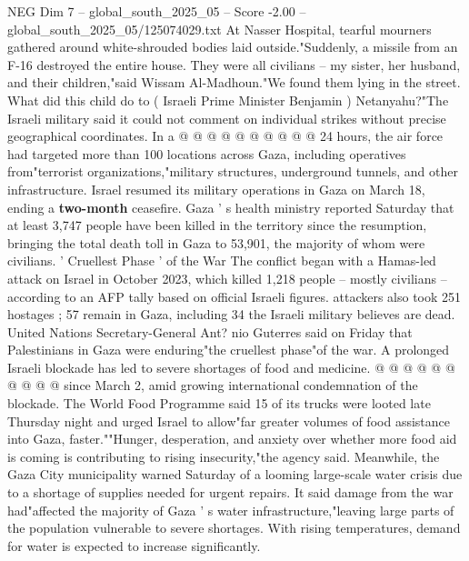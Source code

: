 \begin{textsample}{NEG Dim 7 – global\_south\_2025\_05 – Score -2.00 – global\_south\_2025\_05/125074029.txt}
At Nasser Hospital, tearful mourners gathered around white-shrouded bodies laid outside."Suddenly, a missile from an F-16 destroyed the entire house.
They were all civilians -- my sister, her husband, and their children,"said Wissam Al-Madhoun."We found them lying in the street.
What did this child do to ( Israeli Prime Minister Benjamin ) Netanyahu?"The Israeli military said it could not comment on individual strikes without precise geographical coordinates.
In a @ @ @ @ @ @ @ @ @ @ 24 hours, the air force had targeted more than 100 locations across Gaza, including operatives from"terrorist organizations,"military structures, underground tunnels, and other infrastructure.
Israel resumed its military operations in Gaza on March 18, ending a \textbf{two-month} ceasefire.
Gaza ' s health ministry reported Saturday that at least 3,747 people have been killed in the territory since the resumption, bringing the total death toll in Gaza to 53,901, the majority of whom were civilians. ' Cruellest Phase ' of the War The conflict began with a Hamas-led attack on Israel in October 2023, which killed 1,218 people -- mostly civilians -- according to an AFP tally based on official Israeli figures. attackers also took 251 hostages ; 57 remain in Gaza, including 34 the Israeli military believes are dead.
United Nations Secretary-General Ant? nio Guterres said on Friday that Palestinians in Gaza were enduring"the cruellest phase"of the war.
A prolonged Israeli blockade has led to severe shortages of food and medicine. @ @ @ @ @ @ @ @ @ @ since March 2, amid growing international condemnation of the blockade.
The World Food Programme said 15 of its trucks were looted late Thursday night and urged Israel to allow"far greater volumes of food assistance into Gaza, faster.""Hunger, desperation, and anxiety over whether more food aid is coming is contributing to rising insecurity,"the agency said.
Meanwhile, the Gaza City municipality warned Saturday of a looming large-scale water crisis due to a shortage of supplies needed for urgent repairs.
It said damage from the war had"affected the majority of Gaza ' s water infrastructure,"leaving large parts of the population vulnerable to severe shortages.
With rising temperatures, demand for water is expected to increase significantly.

\end{textsample}
